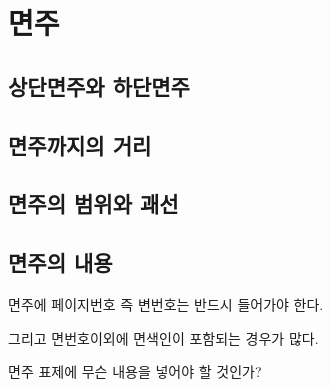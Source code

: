 \documentclass[12pt, a4paper, oneside]{book}
\let\stdsection\section
\renewcommand\section{\newpage\stdsection}
\begin{document}
	\chapter{면주}


	\newpage
	\section{상단면주와 하단면주}
	
	
	
	
	\newpage
	\section{면주까지의 거리}
	
	
	
	\newpage
	\section{면주의 범위와 괘선}
	
	
	\newpage
	\section{면주의 내용}
			
			면주에 페이지번호 즉 변번호는 반드시 들어가야 한다.
	
			그리고 면번호이외에 면색인이 포함되는 경우가 많다.
	
			면주 표제에 무슨 내용을 넣어야 할 것인가?
	
\end{document}
